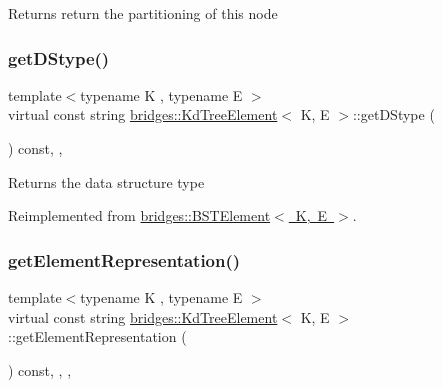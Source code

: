 \begin{DoxyReturn}{Returns}
return the partitioning of this node 
\end{DoxyReturn}
\mbox{\label{classbridges_1_1_kd_tree_element_acdd8f989986b7dd42cfacec73cf52dcb}} 
\subsubsection{\texorpdfstring{get\+D\+Stype()}{getDStype()}}
{\footnotesize\ttfamily template$<$typename K , typename E $>$ \\
virtual const string \mbox{\hyperlink{classbridges_1_1_kd_tree_element}{bridges\+::\+Kd\+Tree\+Element}}$<$ K, E $>$\+::get\+D\+Stype (\begin{DoxyParamCaption}{ }\end{DoxyParamCaption}) const\hspace{0.3cm}{\ttfamily [inline]}, {\ttfamily [override]}, {\ttfamily [virtual]}}

\begin{DoxyReturn}{Returns}
the data structure type 
\end{DoxyReturn}


Reimplemented from \mbox{\hyperlink{classbridges_1_1_b_s_t_element_af3843873c508c24f90b6e73a6f490bf8}{bridges\+::\+B\+S\+T\+Element$<$ K, E $>$}}.

\mbox{\label{classbridges_1_1_kd_tree_element_ad8aa2d89689f33691063fee9c601e2cb}} 
\subsubsection{\texorpdfstring{get\+Element\+Representation()}{getElementRepresentation()}}
{\footnotesize\ttfamily template$<$typename K , typename E $>$ \\
virtual const string \mbox{\hyperlink{classbridges_1_1_kd_tree_element}{bridges\+::\+Kd\+Tree\+Element}}$<$ K, E $>$\+::get\+Element\+Representation (\begin{DoxyParamCaption}{ }\end{DoxyParamCaption}) const\hspace{0.3cm}{\ttfamily [inline]}, {\ttfamily [override]}, {\ttfamily [protected]}, {\ttfamily [virtual]}}

